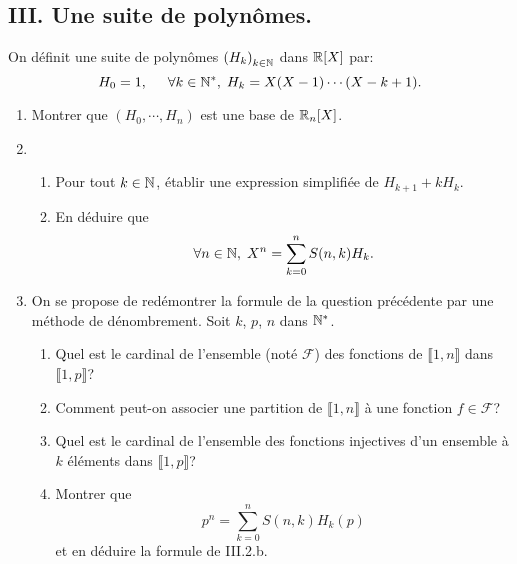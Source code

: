 \subsection*{III. Une suite de polynômes.}
On définit une suite de polynômes $\left( H_k \right)_{k \in \mathbb{N}}$ dans $\mathbb{R}[X]$ par:
\[
 H_0 = 1, \hspace{0.5cm} \forall k\in \mathbb{N}^*,\; H_k = X(X-1) \cdots (X-k+1).
\]
\begin{enumerate}
 \item Montrer que $(H_0, \cdots,H_n)$ est une base de $\mathbb{R}_n[X]$.
 
 \item 
 \begin{enumerate}
  \item Pour tout $k\in \mathbb{N}$, établir une expression simplifiée de $H_{k+1} + k H_k$.
  \item En déduire que
\[
 \forall n \in \mathbb{N}, \; X^n = \sum_{k=0}^n S(n,k) H_k.
\]
 \end{enumerate}
 
 \item On se propose de redémontrer la formule de la question précédente par une méthode de dénombrement. Soit $k$, $p$, $n$ dans $\mathbb{N}^*$. 
 \begin{enumerate}
  \item Quel est le cardinal de l'ensemble (noté $\mathcal{F}$) des fonctions de $\llbracket 1,n \rrbracket$ dans $\llbracket 1,p \rrbracket$?
  \item Comment peut-on associer une partition de $\llbracket 1,n \rrbracket$ à une fonction $f\in \mathcal{F}$?
  \item Quel est le cardinal de l'ensemble des fonctions injectives d'un ensemble à $k$ éléments dans $\llbracket 1,p \rrbracket$?
  \item Montrer que 
\[
 p^n = \sum_{k=0}^n S(n,k) H_k(p)
\]
et en déduire la formule de III.2.b.
 \end{enumerate}

\end{enumerate}

